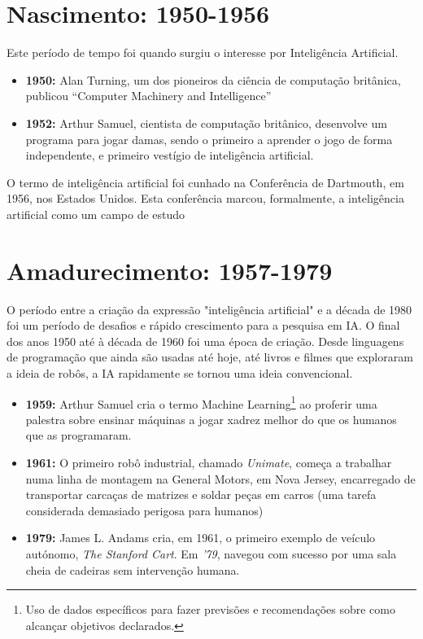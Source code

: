 \documentclass[a4paper, 11pt, onecolumn, oneside]{report}
\begin{document}
\section{Nascimento: 1950-1956}
Este período de tempo foi quando surgiu o interesse por Inteligência Artificial.
%
\begin{itemize}
    \item \textbf{1950:} Alan Turning, um dos pioneiros da ciência de computação britânica, publicou “Computer Machinery and Intelligence”\cite{alan_turning}
    \item \textbf{1952:} Arthur Samuel, cientista de computação britânico, desenvolve um programa para jogar damas, sendo o primeiro a aprender o jogo de forma independente, e primeiro vestígio de inteligência artificial.
\end{itemize}
\par
O termo de inteligência artificial foi cunhado na Conferência de Dartmouth, em 1956, nos Estados Unidos. Esta conferência marcou, formalmente, a inteligência artificial como um campo de estudo 

\section{Amadurecimento: 1957-1979}
O período entre a criação da expressão "inteligência artificial" e a década de 1980 foi um período de desafios e rápido crescimento para a pesquisa em IA. O final dos anos 1950 até à década de 1960 foi uma época de criação. Desde linguagens de programação que ainda são usadas até hoje, até livros e filmes que exploraram a ideia de robôs, a IA rapidamente se tornou uma ideia convencional.

%
\begin{itemize}
    \item \textbf{1959:} Arthur Samuel cria o termo Machine Learning\footnote{Uso de dados específicos para fazer previsões e recomendações sobre como alcançar objetivos declarados.} ao proferir uma palestra sobre ensinar máquinas a jogar xadrez melhor do que os humanos que as programaram.
    \item \textbf{1961:} O primeiro robô industrial, chamado \textit{Unimate}, começa a trabalhar numa linha de montagem na General Motors, em Nova Jersey, encarregado de transportar carcaças de matrizes e soldar peças em carros (uma tarefa considerada demasiado perigosa para humanos)
    \item \textbf{1979:} James L. Andams cria, em 1961, o primeiro exemplo de veículo autónomo, \textit{The Stanford Cart}\cite{stanford_cart}. Em \textit{'79}, navegou com sucesso por uma sala cheia de cadeiras sem intervenção humana.
\end{itemize}
\end{document}
